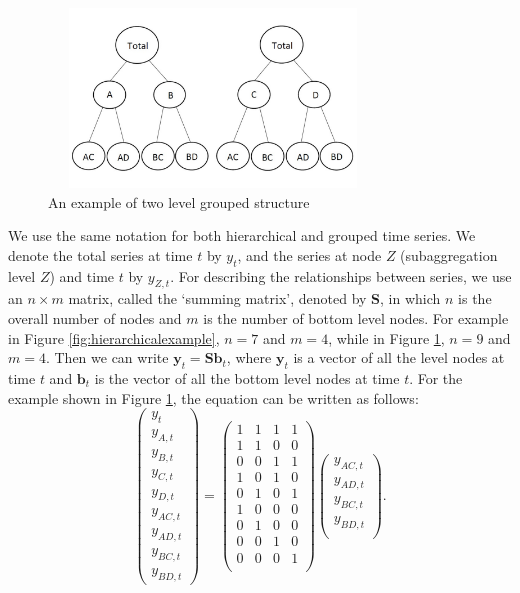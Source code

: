 \documentclass[11pt,a4paper,]{article}
\begin{document}
\begin{figure}

{\centering \includegraphics[width=330px,height=180px]{hcf_files/figure-latex/groupexample-1} 

}

\caption{An example of two level grouped structure}\label{fig:groupexample}
\end{figure}

We use the same notation \autocite[following][]{fpp2} for both
hierarchical and grouped time series. We denote the total series at time
\(t\) by \(y_t\), and the series at node \(Z\) (subaggregation level
\(Z\)) and time \(t\) by \(y_{Z,t}\). For describing the relationships
between series, we use an \(n\times m\) matrix, called the `summing
matrix', denoted by \(\bm{S}\), in which \(n\) is the overall number of
nodes and \(m\) is the number of bottom level nodes. For example in
Figure \ref{fig:hierarchicalexample}, \(n = 7\) and \(m = 4\), while in
Figure \ref{fig:groupexample}, \(n=9\) and \(m=4\). Then we can write
\(\bm{y}_t=\bm{S}\bm{b}_t\), where \(\bm{y}_t\) is a vector of all the
level nodes at time \(t\) and \(\bm{b}_t\) is the vector of all the
bottom level nodes at time \(t\). For the example shown in Figure
\ref{fig:groupexample}, the equation can be written as follows:
\begin{equation}\label{eq:Smatrixexample}
\begin{pmatrix}
  y_{t}\\y_{A,t}\\y_{B,t}\\y_{C,t}\\y_{D,t}\\y_{AC,t}\\y_{AD,t}\\y_{BC,t}\\y_{BD,t}
\end{pmatrix} =
\begin{pmatrix}
  1&1&1&1\\1&1&0&0\\0&0&1&1\\1&0&1&0\\0&1&0&1\\1&0&0&0\\0&1&0&0\\0&0&1&0\\0&0&0&1\\
\end{pmatrix}
\begin{pmatrix}
  y_{AC,t}\\y_{AD,t}\\y_{BC,t}\\y_{BD,t}\\
\end{pmatrix}.
\end{equation}
\end{document}
